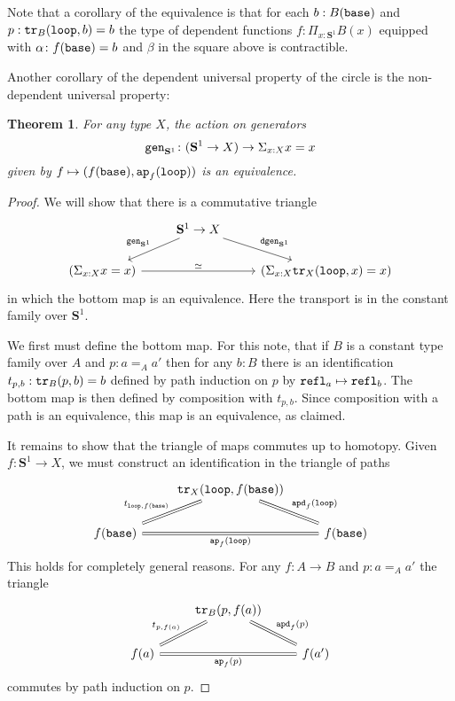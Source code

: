 \documentclass{amsart}
\theoremstyle{theorem}
\newtheorem*{thm}{Theorem}
\theoremstyle{definition}
\theoremstyle{remark}
\newcommand{\0}{\mathbbe{0}}
\newcommand{\1}{\mathbbe{1}}
\newcommand{\2}{\mathbbe{2}}
\newcommand{\3}{\mathbbe{3}}
\newcommand{\4}{\mathbbe{4}}
\newcommand{\term}[1]{{\textup{\texttt{#1}}}}
\newcommand{\refl}{\term{refl}}
\newcommand{\ap}{\term{ap}}
\newcommand{\tr}{\term{tr}}
\newcommand{\apd}{\term{apd}}
\newcommand{\Sone}{\mathbf{S}^1}
\newcommand{\base}{\term{base}}
\newcommand{\lloop}{\term{loop}}
\begin{document}
Note that a corollary of the equivalence is that for each $b : B(\base)$ and $p : \tr_B(\lloop, b) =b $ the type of dependent functions $f : \Pi_{x:\Sone} B(x)$ equipped with $\alpha \colon f(\base) = b$ and $\beta$ in the square above is contractible.

Another corollary of the dependent universal property of the circle is the non-dependent universal property:

\begin{thm} For any type $X$, the action on generators
  \[ \term{gen}_{\Sone} \colon (\Sone \to X) \to \Sigma_{x: X} x =x \]
  given by $f \mapsto (f(\base), \ap_f(\lloop))$ is an equivalence.
\end{thm}
\begin{proof} We will show that there is a commutative triangle
  \[
    \begin{tikzcd}
      & \Sone \to X \arrow[dl, "\term{gen}_{\Sone}"'] \arrow[dr, "\term{dgen}_{\Sone}"] \\ \left( \Sigma_{x:X} x=x \right) \arrow[rr, "\simeq"] & & \left( \Sigma_{x:X} \tr_{X}(\lloop,x) =x \right)
    \end{tikzcd}\]
    in which the bottom map is an equivalence. Here the transport is in the constant family over $\Sone$. 

 We first must define the bottom map. For this note, that if $B$ is a constant type family over $A$ and $p : a =_A a'$ then for any $b : B$ there is an identification $t_{p,b} : \tr_B(p,b)=b$ defined by path induction on $p$ by $\refl_a \mapsto \refl_b$.    The bottom map is then defined by composition with $t_{p,b}$. Since composition with a path is an equivalence, this map is an equivalence, as claimed.

 It remains to show that the triangle of maps commutes up to homotopy. Given $f \colon \Sone \to X$, we must construct an identification in the triangle of paths
 \[
 \begin{tikzcd}
    & \tr_X(\lloop, f(\base)) \arrow[dr, equals, "\apd_f(\lloop)"] \arrow[dl, equals, "t_{\lloop,f(\base)}"'] \\ f(\base) \arrow[rr, equals, "\ap_f(\lloop)"'] && f(\base)
 \end{tikzcd}  
 \]
This holds for completely general reasons. For any $f : A \to B$ and $p : a=_A a'$ the triangle
\[
 \begin{tikzcd}
    & \tr_B(p, f(a)) \arrow[dr, equals, "\apd_f(p)"] \arrow[dl, equals, "t_{p,f(a)}"'] \\ f(a) \arrow[rr, equals, "\ap_f(p)"'] && f(a')
 \end{tikzcd}  
 \]
 commutes by path induction on $p$.
  \end{proof}
\end{document}
